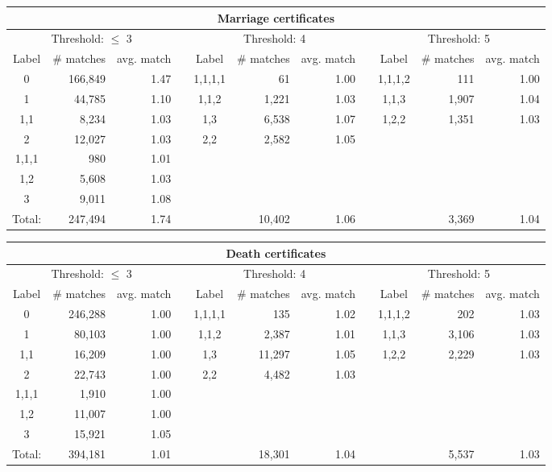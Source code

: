 \begin{table}
\begin{center}
		\bigskip
	\resizebox{\columnwidth}{!} {
		\begin{tabular}{*{2}{crrr}crr}
			\toprule
			\multicolumn{11}{c}{Marriage certificates}\\
			\toprule
			\multicolumn{3}{c}{Threshold: $\leq$ 3} & & \multicolumn{3}{c}{Threshold: 4} && \multicolumn{3}{c}{Threshold: 5}\\
			Label & \# matches & avg. match & & Label & \# matches & avg. match & & Label & \# matches & avg. match \\
			\cmidrule{1-3} \cmidrule{5-7} \cmidrule{9-11} 
			0 		& 166,849 &	1.47 && 1,1,1,1	& 61	 & 1.00	&& 1,1,1,2 	& 111   	& 1.00\\
			1 		& 44,785  &	1.10 && 1,1,2 	& 1,221  & 1.03	&& 1,1,3 	& 1,907 	& 1.04\\
			1,1 	& 8,234   &	1.03 && 1,3 	& 6,538  & 1.07	&& 1,2,2 	& 1,351 	& 1.03\\
			2 		& 12,027  &	1.03 && 2,2 	& 2,582  & 1.05	&& 			&			&\\
			1,1,1 	& 980     &	1.01 &&			&		 &	&&				&			&\\
			1,2 	& 5,608   &	1.03 &&			&		 &	&&				&			&\\
			3 		& 9,011   &	1.08 &&			&		 &	&&				&			&\\
			\midrule
			Total: 	& 247,494 &	1.74 && 		& 10,402 & 1.06	&&			& 3,369 	& 1.04\\
			\bottomrule
		\end{tabular}
	}
		\hspace*{-1.85cm}

		\bigskip
	\resizebox{\columnwidth}{!} {
		\begin{tabular}{*{2}{crrr}crr}
			\toprule
			\multicolumn{11}{c}{Death certificates}\\
			\toprule
			\multicolumn{3}{c}{Threshold: $\leq$ 3} & & \multicolumn{3}{c}{Threshold: 4} && \multicolumn{3}{c}{Threshold: 5}\\
			Label & \# matches & avg. match & & Label & \# matches & avg. match & & Label & \# matches & avg. match \\
			\cmidrule{1-3} \cmidrule{5-7} \cmidrule{9-11} 
			0 		& 246,288 & 1.00	&& 1,1,1,1 	& 135	 & 1.02	&& 1,1,1,2 	&  202	  & 1.03\\
			1 		& 80,103  &	1.00	&& 1,1,2 	& 2,387  & 1.01	&& 1,1,3 	&  3,106  & 1.03\\
			1,1 	& 16,209  &	1.00	&& 1,3 		& 11,297 & 1.05	&& 1,2,2 	&  2,229  & 1.03\\
			2 		& 22,743  &	1.00	&& 2,2 		& 4,482  & 1.03	&&   		&   	  & \\
			1,1,1 	& 1,910   &	1.00 	&&			&			&&			&&\\
			1,2 	& 11,007  &	1.00 	&&			&			&&			&&\\
			3 		& 15,921  &	1.05	&&			&			&&			&&\\
			\midrule
			Total: 	& 394,181 &	1.01 	&& 			& 18,301 & 1.04	&&			& 5,537   & 1.03\\
			\bottomrule
		\end{tabular}
	}
	\hspace*{-1.85cm}
	\end{center}
\end{table}




